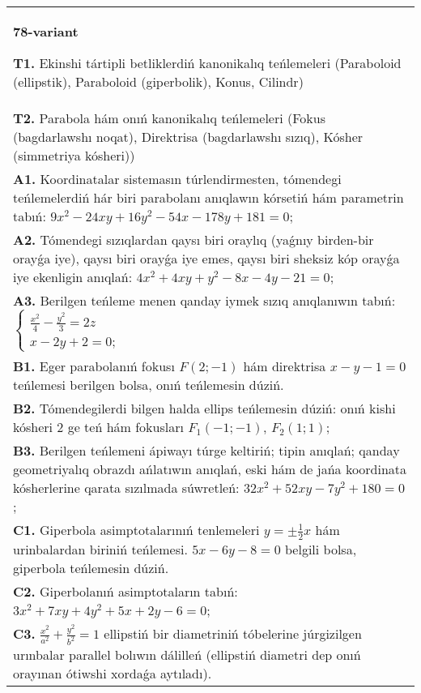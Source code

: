 \documentclass{article}
\begin{document}
\begin{tabular}{m{17cm}}
\textbf{78-variant}
\newline

\textbf{T1.} Ekinshi tártipli betliklerdiń kanonikalıq teńlemeleri (Paraboloid (ellipstik), Paraboloid (giperbolik), Konus, Cilindr) \\
\textbf{T2.} Parabola hám onıń kanonikalıq teńlemeleri (Fokus (bagdarlawshı noqat), Direktrisa (bagdarlawshı sızıq), Kósher (simmetriya kósheri)) \\
\textbf{A1.} Koordinatalar sistemasın túrlendirmesten, tómendegi teńlemelerdiń hár biri parabolanı anıqlawın kórsetiń hám parametrin tabıń: $9 x^2-24 x y+16 y^2-54 x-178 y+181=0$; \\
\textbf{A2.} Tómendegi sızıqlardan qaysı biri oraylıq (yaǵnıy birden-bir orayǵa iye), qaysı biri orayǵa iye emes, qaysı biri sheksiz kóp orayǵa iye ekenligin anıqlań:  $4 x^2+4 x y+y^2-8 x-4 y-21=0$; \\
\textbf{A3.} Berilgen teńleme menen qanday iymek sızıq anıqlanıwın tabıń: $\left\{\begin{array}{l}\frac{x^2}{4}-\frac{y^2}{3}=2 z \\ x-2 y+2=0 ;\end{array}\right.$ \\
\textbf{B1.} Eger parabolanıń fokusı $F(2;-1) $ hám direktrisa $x-y-1=0$ teńlemesi berilgen bolsa, onıń teńlemesin dúziń. \\
\textbf{B2.} Tómendegilerdi bilgen halda ellips teńlemesin dúziń: onıń kishi kósheri 2 ge teń hám fokusları $F_1 (-1;-1) $, $F_2 (1; 1) $; \\
\textbf{B3.} Berilgen teńlemeni ápiwayı túrge keltiriń; tipin anıqlań; qanday geometriyalıq obrazdı ańlatıwın anıqlań, eski hám de jańa koordinata kósherlerine qarata sızılmada súwretleń: $32 x^2+52 x y-7 y^2+180=0$; \\
\textbf{C1.} Giperbola asimptotalarınıń tenlemeleri $y= \pm \frac{1}{2} x$ hám urinbalardan biriniń teńlemesi. $5 x-6 y-8=0$ belgili bolsa, giperbola teńlemesin dúziń. \\
\textbf{C2.} Giperbolanıń asimptotaların tabıń: $3 x^2+7 x y+4 y^2+5 x+2 y-6=0$; \\
\textbf{C3.} $\frac{x^2}{a^2}+\frac{y^2}{b^2}=1$ ellipstiń bir diametriniń tóbelerine júrgizilgen urınbalar parallel bolıwın dálilleń (ellipstiń diametri dep onıń orayınan ótiwshi xordaǵa aytıladı). \\

\end{tabular}
\vspace{1cm}
\end{document}
